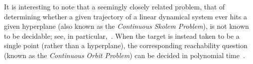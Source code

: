 It is interesting to note that a seemingly closely related problem,
that of determining whether a given trajectory of a linear dynamical
system ever hits a given hyperplane (also known as the
\emph{Continuous Skolem Problem}), is not known to be decidable; see,
in particular,~\cite{ContinuousSkolem,ContinuousSkolem3,COW16b:LICS16}. When the
target is instead taken to be a single point (rather than a
hyperplane), the corresponding reachability question (known as the
\emph{Continuous Orbit Problem}) can be decided in polynomial
time~\cite{Hainry08}.

